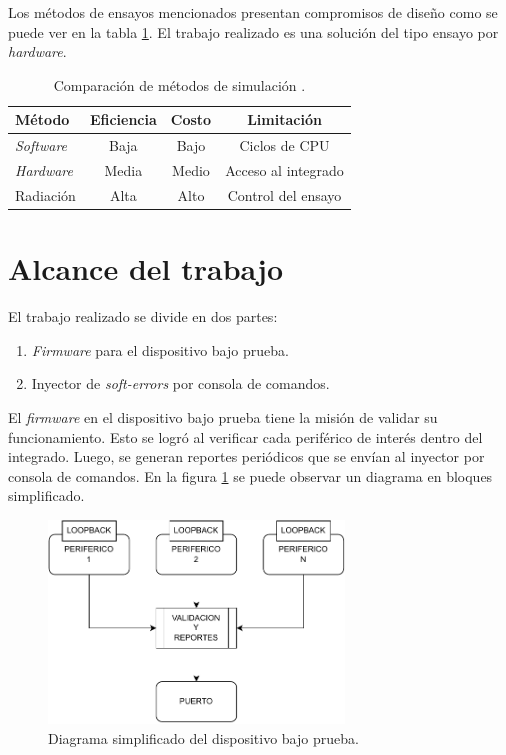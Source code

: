 
Los métodos de ensayos mencionados presentan compromisos de diseño como se puede ver en la tabla \ref{tab:arte}.
El trabajo realizado es una solución del tipo ensayo por \emph{hardware}.

\begin{table}[h]
	\centering
	\caption[Comparación de métodos de simulación]{Comparación de métodos de simulación \citep{ARTICLE:velazco}.}
	\begin{tabular}{l c c c}    
		\toprule
        \textbf{Método}        & \textbf{Eficiencia} & \textbf{Costo} & \textbf{Limitación}\\
		\midrule
        \emph{Software}        & Baja                & Bajo           & Ciclos de CPU\\		
        \emph{Hardware}        & Media               & Medio          & Acceso al integrado\\
        Radiación              & Alta                & Alto           & Control del ensayo\\
		\bottomrule
		\hline
	\end{tabular}
	\label{tab:arte}
\end{table}

\section{Alcance del trabajo}
\label{sec:alcance}

El trabajo realizado se divide en dos partes:
\begin{enumerate}
    \item \emph{Firmware} para el dispositivo bajo prueba.
    \item Inyector de \emph{soft-errors} por consola de comandos.
\end{enumerate}

El \emph{firmware} en el dispositivo bajo prueba tiene la misión de validar su funcionamiento.
Esto se logró al verificar cada periférico de interés dentro del integrado.
Luego, se generan reportes periódicos que se envían al inyector por consola de comandos.
En la figura \ref{fig:dutsimple} se puede observar un diagrama en bloques simplificado.

\begin{figure}[htbp]
	\centering
	\includegraphics[width=0.7\textwidth]{./Figures/dutsimple.pdf}
    \caption{Diagrama simplificado del dispositivo bajo prueba.}
	\label{fig:dutsimple}
\end{figure}

